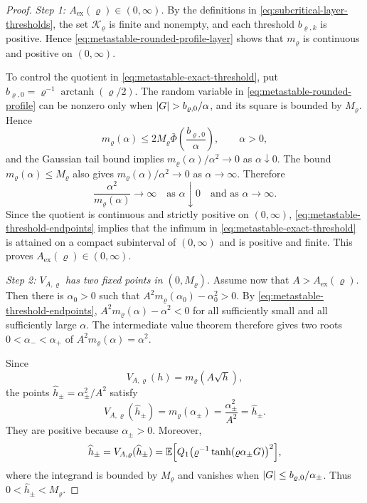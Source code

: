 \documentclass[11pt,reqno,a4paper]{article}
\newcommand{\Ee}{\E}
\DeclareMathOperator{\arctanh}{arctanh}
\begin{document}
\begin{proof}
  \emph{Step 1: $A_{\mathrm{ex}}(\varrho)\in(0,\infty)$.}
  By the definitions in \cref{eq:subcritical-layer-thresholds}, the set
  $\mathcal K_\varrho$ is finite and nonempty, and each threshold
  $b_{\varrho,k}$ is positive. Hence
  \cref{eq:metastable-rounded-profile-layer} shows that $m_\varrho$ is
  continuous and positive on $(0,\infty)$.

  To control the quotient in \cref{eq:metastable-exact-threshold}, put
  $b_{\varrho,0}=\varrho^{-1}\arctanh(\varrho/2)$. The random variable in
  \cref{eq:metastable-rounded-profile} can be nonzero only when
  $\abs G>b_{\varrho,0}/\alpha$, and its square is bounded by $M_\varrho$.
  Hence
  \begin{equation*}
    m_\varrho(\alpha)
    \leq
    2M_\varrho
    \bar\Phi\left(\frac{b_{\varrho,0}}{\alpha}\right),
    \qquad
    \alpha>0,
  \end{equation*}
  and the Gaussian tail bound implies
  $m_\varrho(\alpha)/\alpha^2\to0$ as $\alpha\downarrow0$. The bound
  $m_\varrho(\alpha)\leq M_\varrho$ also gives
  $m_\varrho(\alpha)/\alpha^2\to0$ as $\alpha\to\infty$. Therefore
  \begin{equation}\label{eq:metastable-threshold-endpoints}
    \frac{\alpha^2}{m_\varrho(\alpha)}
    \longrightarrow\infty
    \quad\mbox{as }\alpha\downarrow0
    \quad\mbox{and as }\alpha\to\infty .
  \end{equation}
  Since the quotient is continuous and strictly positive on $(0,\infty)$,
  \cref{eq:metastable-threshold-endpoints} implies that the infimum in
  \cref{eq:metastable-exact-threshold} is attained on a compact subinterval
  of $(0,\infty)$ and is positive and finite. This proves
  $A_{\mathrm{ex}}(\varrho)\in(0,\infty)$.

  \emph{Step 2: $V_{A,\varrho}$ has two fixed points in
  $(0,M_\varrho)$.}
  Assume now that $A>A_{\mathrm{ex}}(\varrho)$. Then there is
  $\alpha_0>0$ such that
  $A^2m_\varrho(\alpha_0)-\alpha_0^2>0$. By
  \cref{eq:metastable-threshold-endpoints},
  $A^2m_\varrho(\alpha)-\alpha^2<0$ for all sufficiently small and all
  sufficiently large $\alpha$. The intermediate value theorem therefore gives
  two roots
  $0<\alpha_-<\alpha_+$ of
  $A^2m_\varrho(\alpha)=\alpha^2$.

  Since
  \begin{equation*}
    V_{A,\varrho}(h)=m_\varrho(A\sqrt h),
  \end{equation*}
  the points $\widehat h_\pm=\alpha_\pm^2/A^2$ satisfy
  \begin{equation*}
    V_{A,\varrho}(\widehat h_\pm)
    =
    m_\varrho(\alpha_\pm)
    =
    \frac{\alpha_\pm^2}{A^2}
    =
    \widehat h_\pm .
  \end{equation*}
  They are positive because $\alpha_\pm>0$. Moreover,
  \begin{equation*}
    \widehat h_\pm
    =
    V_{A,\varrho}(\widehat h_\pm)
    =
    \Ee\left[
      Q_1\left(
        \varrho^{-1}
        \tanh(\varrho\alpha_\pm G)
      \right)^2
    \right],
  \end{equation*}
  where the integrand is bounded by $M_\varrho$ and vanishes when
  $\abs G\leq b_{\varrho,0}/\alpha_\pm$. Thus
  $0<\widehat h_\pm<M_\varrho$.


\end{proof}
\end{document}

